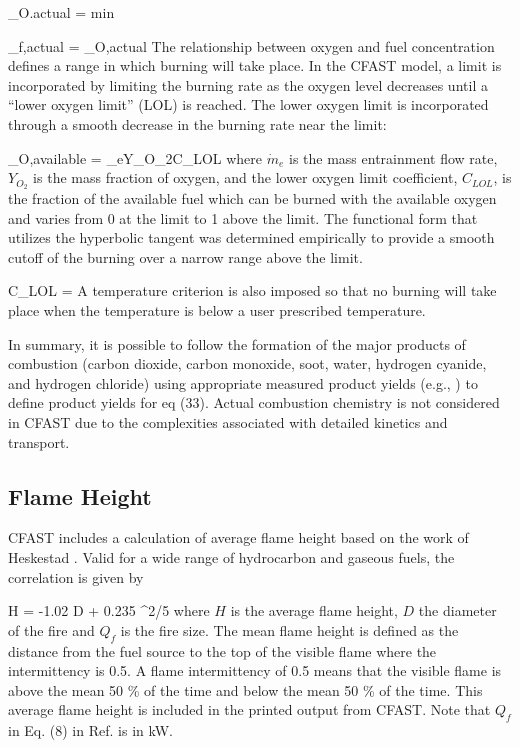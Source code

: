 \be {}_{O.actual} = min  \ee

\be {}_{f,actual} = _{O,actual}   \ee
The relationship between oxygen and fuel concentration defines a range in which burning will take place.  In the CFAST model, a limit is incorporated by limiting the burning rate as the oxygen level decreases until a ``lower oxygen limit'' (LOL) is reached. The lower oxygen limit is incorporated through a smooth decrease in the burning rate near the limit:

\be {}_{O,available} = _eY_{O_2}C_{LOL} \ee
where $\dot{m}_e$ is the mass entrainment flow rate, $Y_{O_2}$ is the mass fraction of oxygen, and the lower oxygen limit coefficient, $C_{LOL}$, is the fraction of the available fuel which can be burned with the available oxygen and varies from 0 at the limit to 1 above the limit.  The functional form that utilizes the hyperbolic tangent was determined empirically to provide a smooth cutoff of the burning over a narrow range above the limit.

\be C_{LOL} =  \ee
A temperature criterion is also imposed so that no burning will take place when the temperature is below a user prescribed temperature.

In summary, it is possible to follow the formation of the major products of combustion (carbon dioxide, carbon monoxide, soot, water, hydrogen cyanide, and hydrogen chloride) using appropriate measured product yields (e.g., \cite{Morehart:1991}) to define product yields for eq (33). Actual combustion chemistry is not considered in CFAST due to the complexities associated with detailed kinetics and transport.

\subsection{Flame Height}

CFAST includes a calculation of average flame height based on the work of Heskestad \cite{Heskestad:2002}. Valid for a wide range of hydrocarbon and gaseous fuels, the correlation is given by

\be H = -1.02 D + 0.235 ^{2/5} \ee
where $H$ is the average flame height, $D$ the diameter of the fire and $Q_f$ is the fire size. The mean flame height is defined as the distance from the fuel source to the top of the visible flame where the intermittency is 0.5.  A flame intermittency of 0.5 means that the visible flame is above the mean 50 \% of the time and below the mean 50 \% of the time.  This average flame height is  included in the printed output from CFAST. Note that $Q_f$ in Eq. (8) in Ref. \cite{Heskestad:2002} is in kW.

